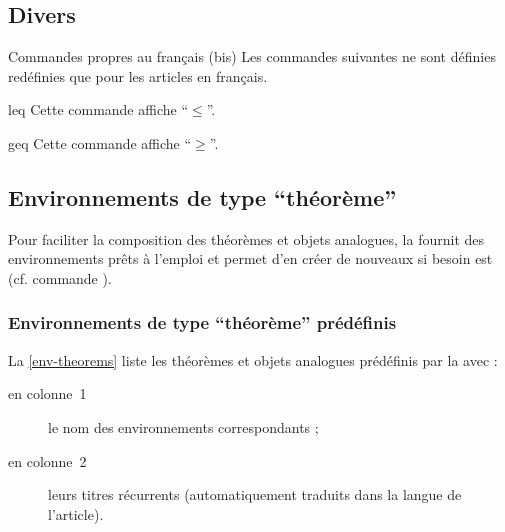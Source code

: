 \documentclass[french,nolocaltoc]{nwejmart}
\newtheorem[title=Fait,style=definition]{fact}
\begin{document}
\subsection{Divers}

\begin{dbremark}{Commandes propres au français (bis)}{}
  Les commandes suivantes ne sont définies redéfinies que pour les articles en
  français.
\end{dbremark}

\begin{docCommand}{leq}{}
  Cette commande affiche \enquote{$\leq$}.
\end{docCommand}
\begin{docCommand}{geq}{}
  Cette commande affiche \enquote{$\geq$}.
\end{docCommand}

\subsection{Environnements de type \enquote{théorème}}

Pour faciliter la composition des théorèmes et objets analogues, la
\nwejmauthorcl{} fournit des environnements prêts à l'emploi et permet d'en
créer de nouveaux si besoin est (cf. commande ).

\subsubsection{Environnements de type \enquote{théorème} prédéfinis}
\label{sec:envir-de-type}

La \vref{env-theorems} liste les théorèmes et objets analogues prédéfinis par la
\nwejmauthorcl{} avec :
\begin{description}
\item[en colonne~1] le nom des environnements correspondants ;
\item[en colonne~2] leurs titres récurrents (automatiquement traduits dans la
  langue de l'article).
\end{description}
\end{document}
